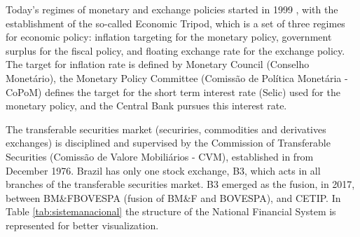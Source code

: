\documentclass[a4paper]{article}
\begin{document}
Today's regimes of monetary and exchange policies started in 1999 , with the establishment of the so-called Economic Tripod, which is a set of three regimes for economic policy: inflation targeting for the monetary policy, government surplus for the fiscal policy, and floating exchange rate for the exchange policy. The target for inflation rate is defined by Monetary Council (Conselho Monetário), the Monetary Policy Committee (Comissão de Política Monetária - CoPoM) defines the target for the short term interest rate (Selic) used for the monetary policy, and the Central Bank pursues this interest rate.

The transferable securities market (securiries, commodities and derivatives exchanges) is disciplined and supervised by the Commission of Transferable Securities (Comissão de Valore Mobiliários - CVM), established in \citet{lei6385} from December 1976. Brazil has only one stock exchange, B3, which acts in all branches of the transferable securities market. B3 emerged as the fusion, in 2017, between BM\&FBOVESPA (fusion of BM\&F and BOVESPA), and CETIP.  In Table \ref{tab:sistemanacional} the structure of the National Financial System is represented for better visualization.
\end{document}
